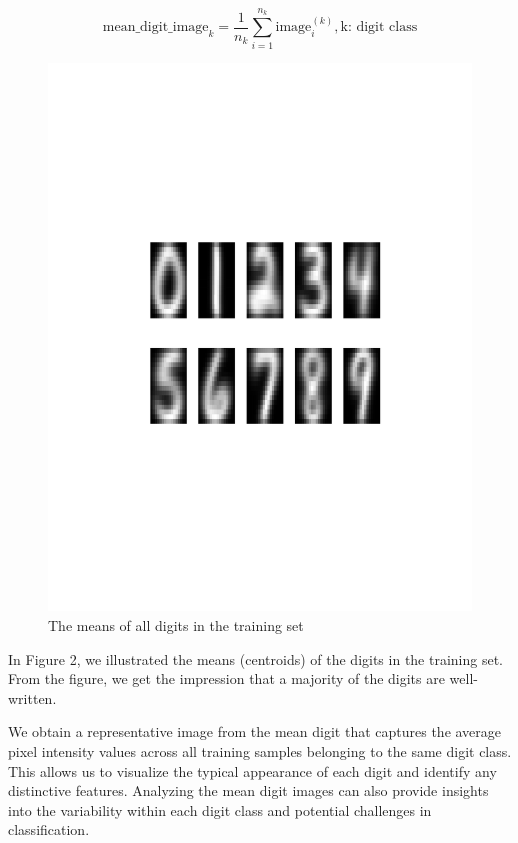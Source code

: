 \documentclass{article}
\begin{document}
\[
\text{mean\_digit\_image}_k = \frac{1}{n_k} \sum_{i=1}^{n_k} \text{image}_i^{(k)}, \text{k: digit class}
\]

\begin{figure}[H]
\centering
\includegraphics[scale=0.5]{mean_digit_images.pdf}
\caption[\abovecaptionskip=18pt]{The means of all digits in the training set}
\label{FIG:FIG 02}
\end{figure}

In Figure 2, we illustrated the means (centroids) of the digits in the training set. From the figure, we get the impression that a majority of the digits are well-written. 

We obtain a representative image from the mean digit that captures the average pixel intensity values across all training samples belonging to the same digit class. This allows us to visualize the typical appearance of each digit and identify any distinctive features. Analyzing the mean digit images can also provide insights into the variability within each digit class and potential challenges in classification.
\end{document}
